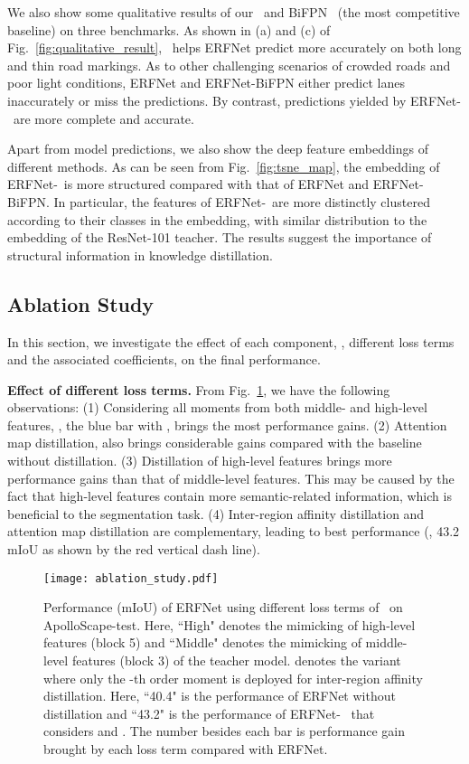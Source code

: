 \documentclass[10pt,twocolumn,letterpaper]{article}
\begin{document}
We also show some qualitative results of our \algorithmname~and BiFPN~\cite{zhu2018bidirectional} (the most competitive baseline) on three benchmarks. As shown in (a) and (c) of Fig.~\ref{fig:qualitative_result}, \algorithmname~helps ERFNet predict more accurately on both long and thin road markings. As to other challenging scenarios of crowded roads and poor light conditions, ERFNet and ERFNet-BiFPN either predict lanes inaccurately or miss the predictions. By contrast, predictions yielded by ERFNet-\algorithmname~are more complete and accurate.

Apart from model predictions, we also show the deep feature embeddings of different methods. As can be seen from Fig.~\ref{fig:tsne_map}, the embedding of ERFNet-\algorithmname~is more structured compared with that of ERFNet and ERFNet-BiFPN.
In particular, the features of ERFNet-\algorithmname~are more distinctly clustered according to their classes in the embedding, with similar distribution to the embedding of the ResNet-101 teacher.
The results suggest the importance of structural information in knowledge distillation.



\subsection{Ablation Study}

In this section, we investigate the effect of each component, \ie, different loss terms and the associated coefficients, on the final performance.


\noindent \textbf{Effect of different loss terms.} From Fig.~\ref{fig:loss}, we have the following observations: (1) Considering all moments from both middle- and high-level features, \ie, the blue bar with , brings the most performance gains. (2) Attention map distillation,  also brings considerable gains compared with the baseline without distillation. (3) Distillation of high-level features brings more performance gains than that of middle-level features. This may be caused by the fact that high-level features contain more semantic-related information, which is beneficial to the segmentation task. (4) Inter-region affinity distillation and attention map distillation are complementary, leading to best performance (\ie, 43.2 mIoU as shown by the red vertical dash line).

\begin{figure}[t]
  \centering
  \texttt{[image: ablation\_study.pdf]}
\caption{Performance (mIoU) of ERFNet using different loss terms of \algorithmname~on ApolloScape-test. Here, ``High" denotes the mimicking of high-level features (block 5) and ``Middle" denotes the mimicking of middle-level features (block 3) of the teacher model.  denotes the variant where only the -th order moment is deployed for inter-region affinity distillation. Here, ``40.4" is the performance of ERFNet without distillation and ``43.2" is the performance of ERFNet-\algorithmname~ that considers  and . The number besides each bar is performance gain brought by each loss term compared with ERFNet.}
  \centering
  \vskip -0.7cm
  \label{fig:loss}
\end{figure}
\end{document}
